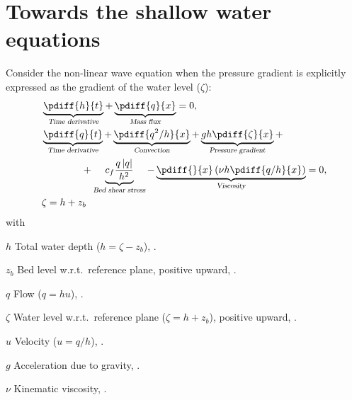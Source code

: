\chapter{Towards the shallow water equations}\label{sec:1d_swe}
Consider the non-linear wave equation when the pressure gradient is explicitly expressed as the gradient of the water level ($\zeta$):
\begin{subequations}
    \begin{align}
        &\underbrace{\pdiff{h}{t}}_{\textsl{Time derivative}}  +
        \underbrace{\pdiff{q}{x}}_{\textsl{Mass flux}} =0,
        \\
        &\underbrace{\pdiff{q}{t}}_{\textsl{Time derivative}}  +
        \underbrace{\pdiff{q^2/h}{x}}_{\textsl{Convection}} +
        \underbrace{gh \pdiff{\zeta}{x}}_{\textsl{Pressure gradient}} +
        \nonumber \\*
        & \qquad \qquad +
        \underbrace{c_f\frac{q\abs{q}}{h^2}}_{\textsl{Bed shear stress}}
        -\underbrace{\pdiff{}{x}\left( \nu h \pdiff{q/h}{x}\right)}_{\textsl{Viscosity}} = 0,
        \\
        &\zeta = h + z_b
    \end{align}
    \label{eq:1d_non_linear_wave2}
\end{subequations}
%
with
\begin{symbollist}
    \item[$h$] Total water depth ($h = \zeta - z_b$), \bunit{\metre}.
    \item[$z_b$] Bed level w.r.t.\ reference plane, positive upward, \bunit{\metre}.
    \item[$q$] Flow ($q = hu$), \bunit{\square\metre\per\second}.
    \item[$\zeta$] Water level w.r.t.\ reference plane ($\zeta = h + z_b$), positive upward, \bunit{\metre}.
    \item[$u$] Velocity ($u = q/h$), \bunit{\metre\per\second}.
    \item[$g$] Acceleration due to gravity, \bunit{\metre\per\square\second}.
    \item[$\nu$] Kinematic viscosity, \bunit{\square\metre\per\second}.
\end{symbollist}

